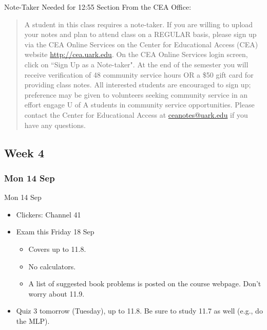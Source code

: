 \documentclass[12pt]{beamer}
\theoremstyle{plain}
\theoremstyle{definition}
\begin{document}
\begin{frame}{\small Note-Taker Needed for 12:55 Section}\footnotesize
From the CEA Office:

\begin{quotation}%
A student in this class requires a note-taker. If you are willing to upload your notes and plan to attend class on a REGULAR basis, please sign up via the CEA Online Services on the Center for Educational Access (CEA) website \url{http://cea.uark.edu}. On the CEA Online Services login screen, click on ``Sign Up as a Note-taker". 
%
At the end of the semester you will receive verification of 48 community service hours OR a \$50 gift card for providing class notes. All interested students are encouraged to sign up; preference may be given to volunteers seeking community service in an effort engage U of A students in community service opportunities. 
%
Please contact the Center for Educational Access at \url{ceanotes@uark.edu} if you have any questions.
\end{quotation}
\end{frame}

\subsection{Week 4}
\subsubsection{Mon 14 Sep}
\begin{frame}{Mon 14 Sep}
\begin{itemize}
\item Clickers: Channel 41
\item Exam this Friday 18 Sep
	\begin{itemize}
	\item Covers up to 11.8.  
	\item No calculators.
	\item A list of suggested book problems is posted on the course webpage.  Don't worry about 11.9.
	\end{itemize}
\item Quiz 3 tomorrow (Tuesday), up to 11.8.  Be sure to study 11.7 as well (e.g., do the MLP).  
\end{itemize}
\end{frame}
\end{document}
